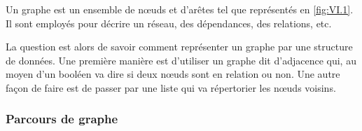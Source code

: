 Un graphe est un ensemble de nœuds et d'arêtes tel que représentés en \cref{fig:VI.1}. Il sont employés pour décrire un réseau, des dépendances, des relations, etc.



La question est alors de savoir comment représenter un graphe par une structure de données. Une première manière est d'utiliser un graphe dit d’adjacence qui, au moyen d'un booléen va dire si deux nœuds sont en relation ou non. Une autre façon de faire est de passer par une liste qui va répertorier les nœuds voisins.

\subsubsection[Parcours de graphe]{Parcours de graphe}
\label{subsub:VI.1.2.2}

